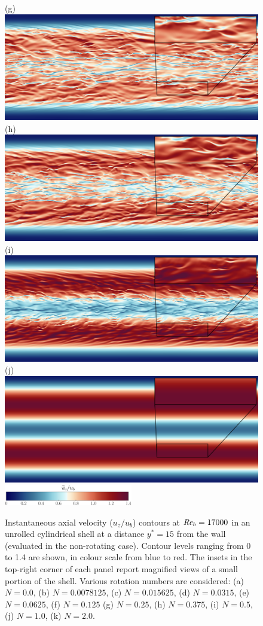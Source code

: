 \documentclass[lineno]{jfm}
\begin{document}
\begin{figure}
                (g) \includegraphics[width=6.cm]{Figures/unrolled_rotz0_roty0.1875_u.png} \\ 
		(h) \includegraphics[width=6.cm]{Figures/unrolled_rotz0_roty0.25_u.png} 
		(i) \includegraphics[width=6.cm]{Figures/unrolled_rotz0_roty0.5_u.png} \\
                (j) \includegraphics[width=6.cm]{Figures/unrolled_rotz0_roty1.0_u.png} 
		\\ \includegraphics[width=0.5\textwidth]{Figures/uz_cmap.eps}
		\caption{
			Instantaneous axial velocity ($u_z/u_b$) contours at $\mbox{\textit{Re}}_b = 17000$
			in an unrolled cylindrical shell at a distance
			$y^*=15$ from the wall (evaluated in the non-rotating case).
			Contour levels ranging from 0 to 1.4 are shown,
			in colour scale from blue to red. 
			The insets in the top-right corner of each panel report magnified views of a small portion of the shell.
			Various rotation numbers are considered:
                        (a) $N = 0.0$,
                        (b) $N = 0.0078125$,
                        (c) $N = 0.015625$,
                        (d) $N = 0.0315$,
                        (e) $N = 0.0625$,
                        (f) $N = 0.125$
                        (g) $N = 0.25$,
                        (h) $N = 0.375$,
                        (i) $N = 0.5$,
                        (j) $N = 1.0$,
                        (k) $N = 2.0$.
		}
			\label{fig:utz_500} 
	\end{figure}
	 
\end{document}

